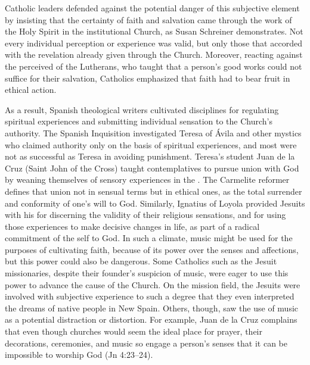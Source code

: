 Catholic leaders defended against the potential danger of this subjective
element by insisting that the certainty of faith and salvation came through the
work of the Holy Spirit in the institutional Church, as Susan Schreiner
demonstrates.%
    \Autocite[131--208]{Schreiner:Certainty}
Not every individual perception or experience was valid, but only those that
accorded with the revelation already given through the Church.
Moreover, reacting against the perceived  of the Lutherans, who
taught that a person's good works could not suffice for their salvation,
Catholics emphasized that faith had to bear fruit in ethical action.

As a result, Spanish theological writers cultivated disciplines for regulating
spiritual experiences and submitting individual sensation to the Church's
authority.
The Spanish Inquisition investigated Teresa of Ávila and other mystics who
claimed authority only on the basis of spiritual experiences, and most were not
as successful as Teresa in avoiding punishment.%
    \Autocites{Ahlgren:TeresaPolitics}{Francisca:Inquisition}
Teresa's student Juan de la Cruz (Saint John of the Cross) taught contemplatives
to pursue union with God by weaning themselves of sensory experiences in the
.
The Carmelite reformer defines that union not in sensual terms but in ethical
ones, as the total surrender and conformity of one's will to God.%
    \Autocite[bk. I, ch.~5--7, pp.~226--248]{JuandelaCruz:Subida}
Similarly, Ignatius of Loyola provided Jesuits with his  for discerning the validity of their religious sensations, and for
using those experiences to make decisive changes in life, as part of a radical
commitment of the self to God.%
    \Autocite[ch.~6]{Schreiner:Certainty}
In such a climate, music might be used for the purposes of cultivating faith,
because of its power over the senses and affections, but this power could also
be dangerous.
Some Catholics such as the Jesuit missionaries, despite their founder's
suspicion of music, were eager to use this power to advance the cause of the
Church.
On the mission field, the Jesuits were involved with subjective experience to
such a degree that they even interpreted the dreams of native people in New
Spain.%
    \Autocite[XXX]{Bailey:Art}
Others, though, saw the use of music as a potential distraction or distortion.
For example, Juan de la Cruz complains that even though churches would seem the
ideal place for prayer, their decorations, ceremonies, and music so engage a
person's senses that it can be impossible to worship God  (Jn 4:23--24).%
    \Autocite[bk.~3, ch.~39--45, pp.~415--424]{JuandelaCruz:Subida}

